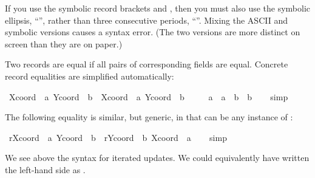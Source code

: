 \begin{isabellebody}
\begin{isamarkuptext}
\begin{warn}
  If you use the symbolic record brackets \isa{{\isasymlparr}} and \isa{{\isasymrparr}},
  then you must also use the symbolic ellipsis, ``\isa{{\isasymdots}}'', rather
  than three consecutive periods, ``\isa{{\isachardot}{\isachardot}{\isachardot}}''.  Mixing the ASCII
  and symbolic versions causes a syntax error.  (The two versions are
  more distinct on screen than they are on paper.)
  \end{warn}%
\end{isamarkuptext}%
\isamarkuptrue%
%
\isamarkuptrue%
%
\begin{isamarkuptext}%
Two records are equal if all pairs of
  corresponding fields are equal.  Concrete record equalities are
  simplified automatically:%
\end{isamarkuptext}%
\isamarkuptrue%
\ {\isachardoublequote}{\isacharparenleft}{\isasymlparr}Xcoord\ {\isacharequal}\ a{\isacharcomma}\ Ycoord\ {\isacharequal}\ b{\isasymrparr}\ {\isacharequal}\ {\isasymlparr}Xcoord\ {\isacharequal}\ a{\isacharprime}{\isacharcomma}\ Ycoord\ {\isacharequal}\ b{\isacharprime}{\isasymrparr}{\isacharparenright}\ {\isacharequal}\isanewline
\ \ \ \ {\isacharparenleft}a\ {\isacharequal}\ a{\isacharprime}\ {\isasymand}\ b\ {\isacharequal}\ b{\isacharprime}{\isacharparenright}{\isachardoublequote}\isanewline
\ \ \isamarkupfalse%
\ simp\isamarkupfalse%
%
\begin{isamarkuptext}%
The following equality is similar, but generic, in that 
  can be any instance of :%
\end{isamarkuptext}%
\isamarkuptrue%
\ {\isachardoublequote}r{\isasymlparr}Xcoord\ {\isacharcolon}{\isacharequal}\ a{\isacharcomma}\ Ycoord\ {\isacharcolon}{\isacharequal}\ b{\isasymrparr}\ {\isacharequal}\ r{\isasymlparr}Ycoord\ {\isacharcolon}{\isacharequal}\ b{\isacharcomma}\ Xcoord\ {\isacharcolon}{\isacharequal}\ a{\isasymrparr}{\isachardoublequote}\isanewline
\ \ \isamarkupfalse%
\ simp\isamarkupfalse%
%
\begin{isamarkuptext}%
We see above the syntax for iterated updates.  We could equivalently
  have written the left-hand side as .


\end{isamarkuptext}
\end{isabellebody}
